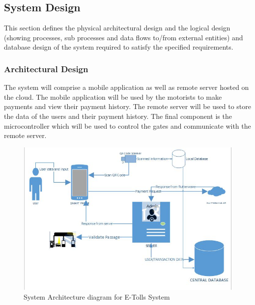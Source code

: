 \subsection{System Design}
This section defines the physical architectural design and the logical design (showing processes, sub processes and data flows to/from external entities) and database design of the system required to satisfy the specified requirements.

\subsubsection{Architectural Design}
The system will comprise a mobile application as well as remote server hosted on the cloud. The mobile application will be used by the motorists to make payments and view their payment history. The remote server will be used to store the data of the users and their payment history. The final component is the microcontroller which will be used to control the gates and communicate with the remote server.


\begin{figure}
    \begin{center}
        \includegraphics[scale = 0.8]{images/etolssys}
        \caption{System Architecture diagram for E-Tolls System}
    \end{center}
\end{figure}


